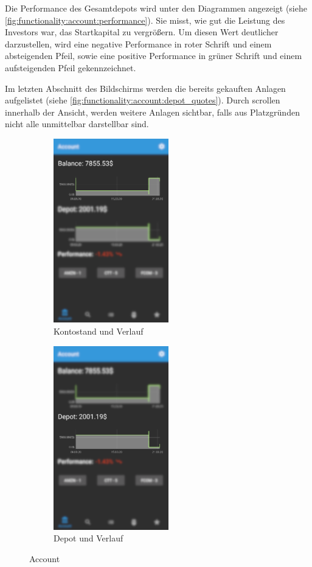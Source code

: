 \documentclass[a4paper]{article}
\begin{document}
Die Performance des Gesamtdepots wird unter den Diagrammen angezeigt (siehe \autoref{fig:functionality:account:performance}). Sie misst, wie gut die Leistung des Investors war, das Startkapital zu vergrößern. Um diesen Wert deutlicher darzustellen, wird eine negative Performance in roter Schrift und einem absteigenden Pfeil, sowie eine positive Performance in grüner Schrift und einem aufsteigenden Pfeil gekennzeichnet.

Im letzten Abschnitt des Bildschirms werden die bereits gekauften Anlagen aufgelistet (siehe \autoref{fig:functionality:account:depot_quotes}). Durch scrollen innerhalb der Ansicht, werden weitere Anlagen sichtbar, falls aus Platzgründen nicht alle unmittelbar darstellbar sind.

\begin{figure}[H]
    \begin{subfigure}{.5\textwidth}
        \centering
        \includegraphics[height=8cm,keepaspectratio]{./images/account/balance.png}
        \caption{Kontostand und Verlauf}
        \label{fig:functionality:account:balance}
    \end{subfigure}
    \begin{subfigure}{.5\textwidth}
        \centering
        \includegraphics[height=8cm,keepaspectratio]{./images/account/depot.png}
        \caption{Depot und Verlauf}
        \label{fig:functionality:account:depot}
    \end{subfigure}
    \caption{Account}
    \label{fig:functionality:account}
\end{figure}
\end{document}
